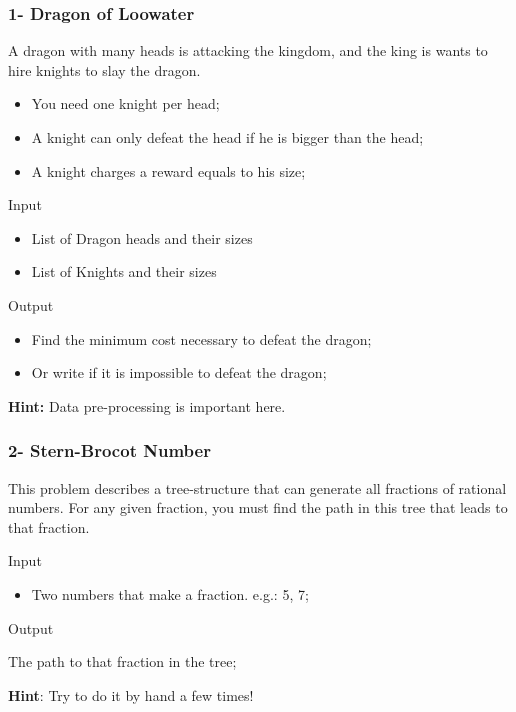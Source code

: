 \begin{frame}
\frametitle{1- Dragon of Loowater}
  A dragon with many heads is attacking the kingdom, and the king is wants to hire knights to slay the dragon.
  \begin{itemize}
    \item You need one knight per head;
    \item A knight can only defeat the head if he is bigger than the head;
    \item A knight charges a reward equals to his size;
  \end{itemize}

  \begin{block}{Input}
    \begin{itemize}
      \item List of Dragon heads and their sizes
      \item List of Knights and their sizes
    \end{itemize}
  \end{block}

  \begin{exampleblock}{Output}
    \begin{itemize}
      \item Find the minimum cost necessary to defeat the dragon;
      \item Or write if it is impossible to defeat the dragon;
    \end{itemize}
  \end{exampleblock}

  {\bf Hint:} Data pre-processing is important here.
\end{frame}

\begin{frame}
  \frametitle{2- Stern-Brocot Number}
  This problem describes a tree-structure that can generate all fractions of rational numbers. For any given fraction, you must find the path in this tree that leads to that fraction.\bigskip

  \begin{block}{Input}
    \begin{itemize}
    \item Two numbers that make a fraction. e.g.: 5, 7;
    \end{itemize}
  \end{block}

  \begin{exampleblock}{Output}
    \begin{itemize}
      The path to that fraction in the tree;
    \end{itemize}
  \end{exampleblock}

  {\bf Hint}: Try to do it by hand a few times!
\end{frame}

